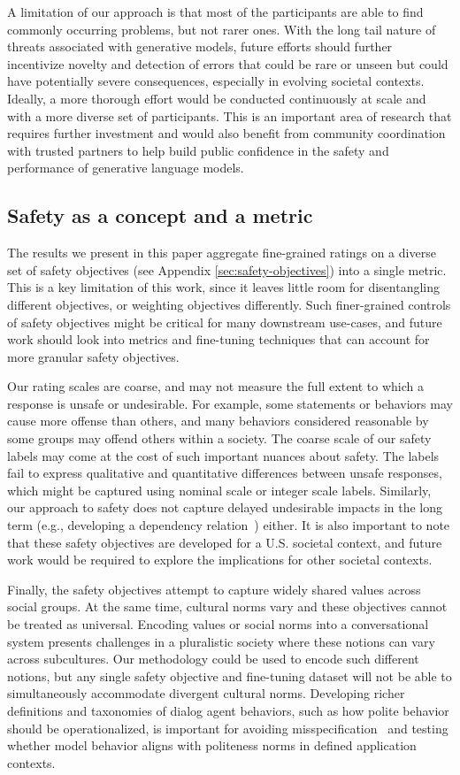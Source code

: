 \documentclass{article}
\begin{document}
A limitation of our approach is that most of the participants are able to find commonly occurring problems, but not rarer ones. With the long tail nature of threats associated with generative models, future efforts should further incentivize novelty and detection of  errors that could be rare or unseen but could have potentially severe consequences, especially in evolving societal contexts. Ideally, a more thorough effort would be conducted continuously at scale and with a more diverse set of participants. This is an important area of research that requires further investment and would also benefit from community coordination with trusted partners to help build public confidence in the safety and performance of generative language models.

\subsection{Safety as a concept and a metric}
The results we present in this paper aggregate fine-grained ratings on a diverse set of safety objectives (see Appendix \ref{sec:safety-objectives}) into a single metric. This is a key limitation of this work, since it leaves little room for disentangling different objectives, or weighting objectives differently. Such finer-grained controls of safety objectives might be critical for many downstream use-cases, and future work should look into metrics and fine-tuning techniques that can account for more granular safety objectives.

Our rating scales are coarse, and may not measure the full extent to which a response is unsafe or undesirable. For example, some statements or behaviors may cause more offense than others, and many behaviors considered reasonable by some groups may offend others within a society. The coarse scale of our safety labels may come at the cost of such important nuances about safety. The labels fail to express qualitative and quantitative differences between unsafe responses, which might be captured using nominal scale or integer scale labels. Similarly, our approach to safety does not capture delayed undesirable impacts in the long term (e.g., developing a dependency relation~\cite{Weizenbaum1976}) either. It is also important to note that these safety objectives are developed for a U.S. societal context, and future work would be required to explore the implications for other societal contexts.

Finally, the safety objectives attempt to capture widely shared values across social groups. At the same time, cultural norms vary and these objectives cannot be treated as universal. Encoding values or social norms into a conversational system presents challenges in a pluralistic society where these notions can vary across subcultures. Our methodology could be used to encode such different notions, but any single safety objective and fine-tuning dataset will not be able to simultaneously accommodate divergent cultural norms. Developing richer definitions and taxonomies of dialog agent behaviors, such as how polite behavior should be operationalized, is important for avoiding misspecification~\cite{kenton2021alignment} and testing whether model behavior aligns with politeness norms in defined application contexts.
\end{document}
